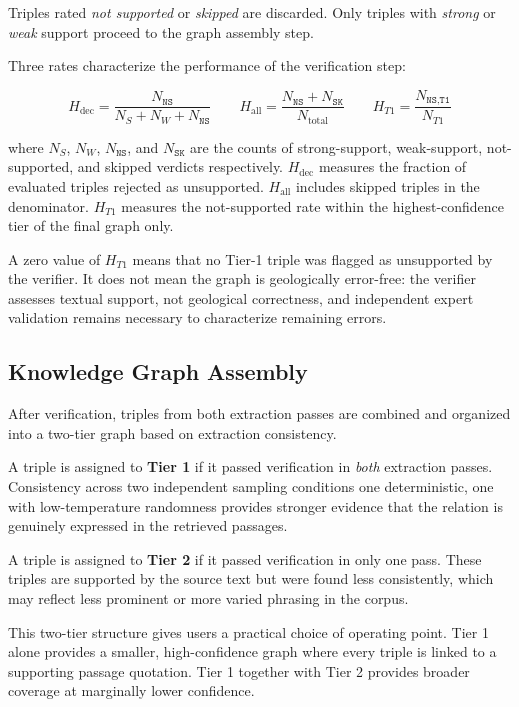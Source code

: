 \documentclass[10pt]{article}
\begin{document}
Triples rated \emph{not supported} or \emph{skipped} are
discarded.
Only triples with \emph{strong} or \emph{weak} support
proceed to the graph assembly step.

Three rates characterize the performance of the verification
step:

\begin{equation}
H_{\text{dec}} =
  \frac{N_{\texttt{NS}}}{N_S + N_W + N_{\texttt{NS}}}
\qquad
H_{\text{all}} =
  \frac{N_{\texttt{NS}} + N_{\texttt{SK}}}{N_{\text{total}}}
\qquad
H_{T1} =
  \frac{N_{\texttt{NS,T1}}}{N_{T1}}
\label{eq:halluc_three}
\end{equation}

\noindent where $N_S$, $N_W$, $N_{\texttt{NS}}$, and
$N_{\texttt{SK}}$ are the counts of strong-support,
weak-support, not-supported, and skipped verdicts
respectively.
$H_{\text{dec}}$ measures the fraction of evaluated triples
rejected as unsupported.
$H_{\text{all}}$ includes skipped triples in the
denominator.
$H_{T1}$ measures the not-supported rate within the
highest-confidence tier of the final graph only.

A zero value of $H_{T1}$ means that no Tier-1 triple was
flagged as unsupported by the verifier.
It does not mean the graph is geologically error-free:
the verifier assesses textual support, not geological
correctness, and independent expert validation remains
necessary to characterize remaining errors.

\subsection{Knowledge Graph Assembly}
\label{sec:tiered}

After verification, triples from both extraction passes are
combined and organized into a two-tier graph based on
extraction consistency.

A triple is assigned to \textbf{Tier 1} if it passed
verification in \emph{both} extraction passes.
Consistency across two independent sampling conditions 
one deterministic, one with low-temperature randomness 
provides stronger evidence that the relation is genuinely
expressed in the retrieved passages.

A triple is assigned to \textbf{Tier 2} if it passed
verification in only one pass.
These triples are supported by the source text but were
found less consistently, which may reflect less prominent
or more varied phrasing in the corpus.

This two-tier structure gives users a practical choice of
operating point.
Tier 1 alone provides a smaller, high-confidence graph where
every triple is linked to a supporting passage quotation.
Tier 1 together with Tier 2 provides broader coverage at
marginally lower confidence.
\end{document}
